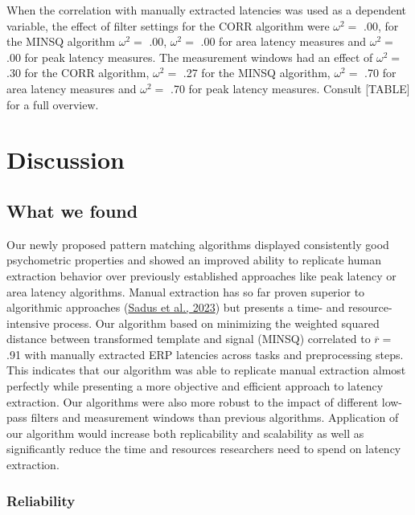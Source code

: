 \documentclass[
  man,floatsintext]{apa7}
\begin{document}
When the correlation with manually extracted latencies was used as a dependent variable, the effect of filter settings for the CORR algorithm were \(\omega^2 =\) .00, for the MINSQ algorithm \(\omega^2 =\) .00, \(\omega^2 =\) .00 for area latency measures and \(\omega^2 =\) .00 for peak latency measures. The measurement windows had an effect of \(\omega^2 =\) .30 for the CORR algorithm, \(\omega^2 =\) .27 for the MINSQ algorithm, \(\omega^2 =\) .70 for area latency measures and \(\omega^2 =\) .70 for peak latency measures. Consult {[}TABLE{]} for a full overview.

\hypertarget{discussion}{%
\section{Discussion}\label{discussion}}

\hypertarget{what-we-found}{%
\subsection{What we found}\label{what-we-found}}

Our newly proposed pattern matching algorithms displayed consistently good psychometric properties and showed an improved ability to replicate human extraction behavior over previously established approaches like peak latency or area latency algorithms. Manual extraction has so far proven superior to algorithmic approaches (\protect\hyperlink{ref-sadus2023multiverse}{Sadus et al., 2023}) but presents a time- and resource-intensive process. Our algorithm based on minimizing the weighted squared distance between transformed template and signal (MINSQ) correlated to \(\overline{r} =\) .91 with manually extracted ERP latencies across tasks and preprocessing steps. This indicates that our algorithm was able to replicate manual extraction almost perfectly while presenting a more objective and efficient approach to latency extraction. Our algorithms were also more robust to the impact of different low-pass filters and measurement windows than previous algorithms. Application of our algorithm would increase both replicability and scalability as well as significantly reduce the time and resources researchers need to spend on latency extraction.

\hypertarget{reliability-2}{%
\subsubsection{Reliability}\label{reliability-2}}
\end{document}
